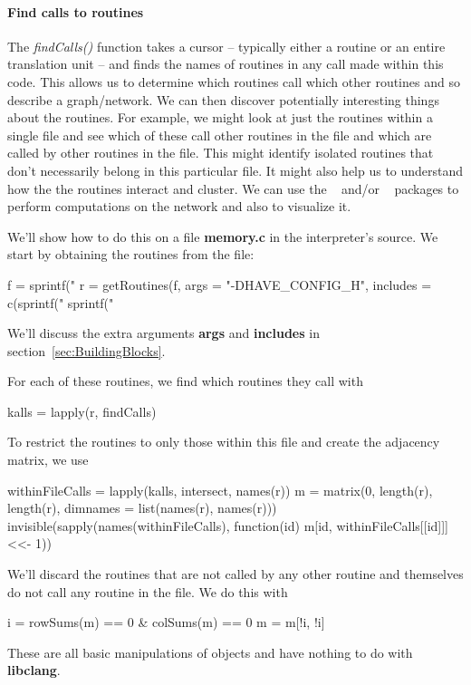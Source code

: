 \documentclass[article]{jss}
\def\R{\proglang{R}}
\def\Rpkg#1{\pkg{#1}}
\def\Rfunc#1{\textsl{#1()}}
\def\file#1{\textbf{#1}}
\def\Rarg#1{\textbf{#1}}
\def\libclang{\textbf{libclang}}
\begin{document}
\paragraph{Find calls to routines}
The \Rfunc{findCalls} function takes a cursor -- typically either a
routine or an entire translation unit -- and finds the names of
routines in any call made within this code.  This allows us to
determine which routines call which other routines and so describe a
graph/network.  We can then discover potentially interesting things
about the routines.  For example, we might look at just the routines
within a single file and see which of these call other routines in the
file and which are called by other routines in the file.  This might
identify isolated routines that don't necessarily belong in this
particular file. It might also help us to understand how the the
routines interact and cluster.  We can use the \Rpkg{igraph}~\cite{bib:igraph} and/or
\Rpkg{graph}~\cite{bib:graphPkg} packages to perform computations on the network and also
to visualize it.

We'll show how to do this on a file \file{memory.c} in the \R{}
interpreter's source.
We start by obtaining the routines from the file:
\begin{RCode}
f = sprintf("%
r = getRoutines(f, args = "-DHAVE_CONFIG_H",
                  includes = c(sprintf("%
                               sprintf("%
\end{RCode}
We'll discuss the extra arguments \Rarg{args} and \Rarg{includes} in section~\ref{sec:BuildingBlocks}.

For each of these routines, we find which routines they call with
\begin{RCode}
kalls = lapply(r, findCalls)
\end{RCode}
To restrict the routines to only those within this file
and create the adjacency matrix, we use 
\begin{RCode}
withinFileCalls = lapply(kalls, intersect, names(r))    
m = matrix(0, length(r), length(r), dimnames = list(names(r), names(r)))
invisible(sapply(names(withinFileCalls), 
           function(id) 
              m[id,  withinFileCalls[[id]]] <<- 1))
\end{RCode}
We'll discard the routines that are not called by any other routine
and themselves do not call any routine in the file. We do this with
\begin{RCode}
i = rowSums(m) == 0 & colSums(m) == 0
m = m[!i, !i]  
\end{RCode}
These are all basic \R{} manipulations of \R{} objects and have
nothing to do with \libclang.
\end{document}
